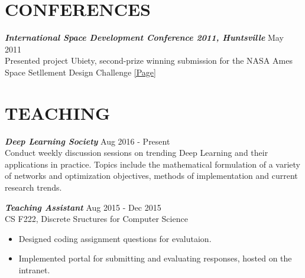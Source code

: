 \documentclass[margin, 10pt]{res} %
\begin{document}
\begin{resume}
 
\section{CONFERENCES}
{\sl \textbf{International Space Development Conference 2011, Huntsville}} \hfill May 2011 \\
Presented project Ubiety, second-prize winning submission for the NASA Ames Space Setllement Design Challenge \href{http://settlement.arc.nasa.gov/Contest/}{[Page]}

 
\section{TEACHING}
{\sl \textbf{Deep Learning Society}} \hfill Aug 2016 - Present\\
Conduct weekly discussion sessions on trending Deep Learning and their applications in practice. Topics include the mathematical formulation of a variety of networks and optimization objectives, methods of implementation and current research trends.

{\sl \textbf{Teaching Assistant}} \hfill Aug 2015 - Dec 2015\\
CS F222, Discrete Sructures for Computer Science
\begin{itemize}  \itemsep -2pt %
\item Designed coding assignment questions for evalutaion.
\item Implemented portal for submitting and evaluating responses, hosted on the intranet.
\end{itemize}


\end{resume}
\end{document}
